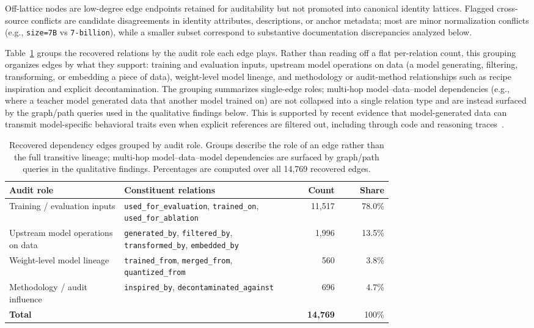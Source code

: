 \noindent
Off-lattice nodes are low-degree edge endpoints retained for auditability but not promoted into canonical identity lattices. Flagged cross-source conflicts are candidate disagreements in identity attributes, descriptions, or anchor metadata; most are minor normalization conflicts (e.g., \texttt{size=7B} vs \texttt{7-billion}), while a smaller subset correspond to substantive documentation discrepancies analyzed below.

Table~\ref{tab:relation-roles} groups the recovered relations by the audit role each edge plays. Rather than reading off a flat per-relation count, this grouping organizes edges by what they support: training and evaluation inputs, upstream model operations on data (a model generating, filtering, transforming, or embedding a piece of data), weight-level model lineage, and methodology or audit-method relationships such as recipe inspiration and explicit decontamination. The grouping summarizes single-edge roles; multi-hop model--data--model dependencies (e.g., where a teacher model generated data that another model trained on) are not collapsed into a single relation type and are instead surfaced by the graph/path queries used in the qualitative findings below. This is supported by recent evidence that model-generated data can transmit model-specific behavioral traits even when explicit references are filtered out, including through code and reasoning traces~\cite{cloud2025subliminallearninglanguagemodels}.

\begin{table}[t]
\centering
\small
\caption{Recovered dependency edges grouped by audit role. Groups describe the role of an edge rather than the full transitive lineage; multi-hop model--data--model dependencies are surfaced by graph/path queries in the qualitative findings. Percentages are computed over all 14,769 recovered edges.}
\label{tab:relation-roles}
\begin{tabular}{p{0.30\linewidth}p{0.43\linewidth}rr}
\toprule
Audit role & Constituent relations & Count & Share \\
\midrule
Training / evaluation inputs
  & \texttt{used\_for\_evaluation}, \texttt{trained\_on}, \texttt{used\_for\_ablation}
  & 11,517 & 78.0\% \\
\addlinespace
Upstream model operations on data
  & \texttt{generated\_by}, \texttt{filtered\_by}, \texttt{transformed\_by}, \texttt{embedded\_by}
  & 1,996 & 13.5\% \\
\addlinespace
Weight-level model lineage
  & \texttt{trained\_from}, \texttt{merged\_from}, \texttt{quantized\_from}
  & 560 & 3.8\% \\
\addlinespace
Methodology / audit influence
  & \texttt{inspired\_by}, \texttt{decontaminated\_against}
  & 696 & 4.7\% \\
\midrule
\textbf{Total} & & \textbf{14,769} & 100\% \\
\bottomrule
\end{tabular}
\end{table}

